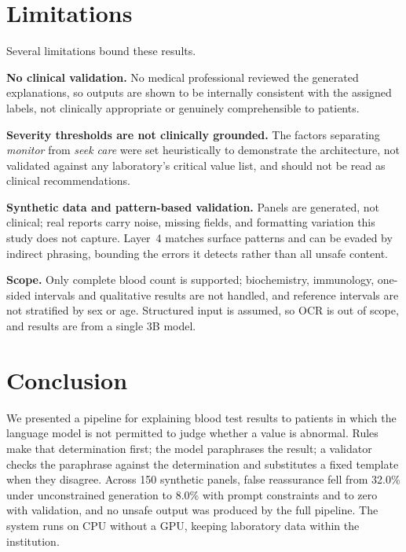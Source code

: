 \documentclass{svproc}
\begin{document}
\section{Limitations}
\label{sec:limitations}

Several limitations bound these results.

\textbf{No clinical validation.} No medical professional reviewed the
generated explanations, so outputs are shown to be internally consistent
with the assigned labels, not clinically appropriate or genuinely
comprehensible to patients.

\textbf{Severity thresholds are not clinically grounded.} The factors
separating \emph{monitor} from \emph{seek care} were set heuristically to
demonstrate the architecture, not validated against any laboratory's
critical value list, and should not be read as clinical recommendations.

\textbf{Synthetic data and pattern-based validation.} Panels are
generated, not clinical; real reports carry noise, missing fields, and
formatting variation this study does not capture. Layer~4 matches surface
patterns and can be evaded by indirect phrasing, bounding the errors it
detects rather than all unsafe content.

\textbf{Scope.} Only complete blood count is supported; biochemistry,
immunology, one-sided intervals and qualitative results are not handled,
and reference intervals are not stratified by sex or age. Structured
input is assumed, so OCR is out of scope, and results are from a single
3B model.


\section{Conclusion}

We presented a pipeline for explaining blood test results to patients in
which the language model is not permitted to judge whether a value is
abnormal. Rules make that determination first; the model paraphrases the
result; a validator checks the paraphrase against the determination and
substitutes a fixed template when they disagree. Across 150 synthetic
panels, false reassurance fell from 32.0\% under unconstrained generation
to 8.0\% with prompt constraints and to zero with validation, and no
unsafe output was produced by the full pipeline. The system runs on CPU
without a GPU, keeping laboratory data within the institution.
\end{document}
